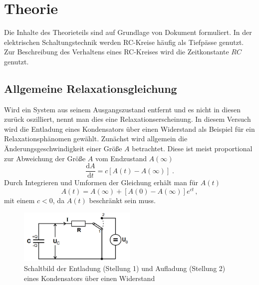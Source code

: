 \section{Theorie}
\label{sec:Theorie}
Die Inhalte des Theorieteils sind auf Grundlage von Dokument \cite{V353} formuliert.
In der elektrischen Schaltungstechnik werden RC-Kreise häufig als Tiefpässe genutzt. 
Zur Beschreibung des Verhaltens eines RC-Kreises wird die Zeitkonstante $RC$ genutzt.
\subsection{Allgemeine Relaxationsgleichung}
Wird ein System aus seinem Ausgangszustand entfernt und es nicht in diesen zurück oszilliert, nennt man dies eine Relaxationserscheinung.
In diesem Versuch wird die Entladung eines Kondensators über einen Widerstand als Beispiel für ein Relaxationsphänomen gewählt.
Zunächst wird allgemein die Änderungsgeschwindigkeit einer Größe $A$ betrachtet. Diese ist meist proportional zur Abweichung der Größe $A$ vom Endzustand $A(\infty)$
\begin{equation*}
    \frac{\text{d}A}{\text{d}t}=c[A(t)-A(\infty)] \; \text{.}
\end{equation*}
Durch Integrieren und Umformen der Gleichung erhält man für $A(t)$
\begin{equation}
    A(t)=A(\infty)+[A(0)-A(\infty)]e^{ct} \, ,
\end{equation}
mit einem $c<0$, da $A(t)$ beschränkt sein muss.
\begin{figure}
    \centering
    \caption{Schaltbild der Entladung (Stellung 1) und Aufladung (Stellung 2) eines Kondensators über einen Widerstand} 
    \label{fig:auf-ent}
    \includegraphics[width = 0.5\textwidth]{pics/auf-ent.png}
\end{figure}

